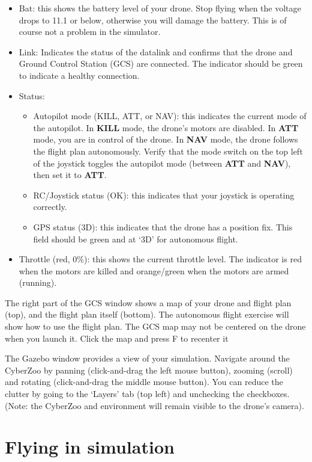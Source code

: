 \begin{itemize}
	\item Bat: this shows the battery level of your drone. Stop flying when the voltage drops to 11.1 or below, otherwise you will damage the battery. This is of course not a problem in the simulator.
	\item Link: Indicates the status of the datalink and confirms that the drone and Ground Control Station (GCS) are connected. The indicator should be green to indicate a healthy connection.
	\item Status:
	\begin{itemize}
		\item Autopilot mode (KILL, ATT, or NAV): this indicates the current mode of the autopilot. In \textbf{KILL} mode, the drone's motors are disabled. In \textbf{ATT} mode, you are in control of the drone. In \textbf{NAV} mode, the drone follows the flight plan autonomously. Verify that the mode switch on the top left of the joystick toggles the autopilot mode (between \textbf{ATT} and \textbf{NAV}), then set it to \textbf{ATT}.
		\item RC/Joystick status (OK): this indicates that your joystick is operating correctly.
		\item GPS status (3D): this indicates that the drone has a position fix. This field should be green and at `3D' for autonomous flight.
	\end{itemize}
	\item Throttle (red, 0\%): this shows the current throttle level. The indicator is red when the motors are killed and orange/green when the motors are armed (running).
\end{itemize}

The right part of the GCS window shows a map of your drone and flight plan (top), and the flight plan itself (bottom). The autonomous flight exercise will show how to use the flight plan. The GCS map may not be centered on the drone when you launch it. Click the map and press F to recenter it

The Gazebo window provides a view of your simulation. Navigate around the CyberZoo by panning (click-and-drag the left mouse button), zooming (scroll) and rotating (click-and-drag the middle mouse button).
You can reduce the clutter by going to the `Layers' tab (top left) and unchecking the checkboxes. (Note: the CyberZoo and environment will remain visible to the drone's camera).

\section{Flying in simulation}

